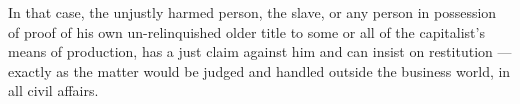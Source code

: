 In that case, the unjustly harmed person, the slave, or any person in possession of proof of his own un-relinquished older title to some or all of the capitalist’s means of production, has a just claim against him and can insist on restitution — exactly as the matter would be judged and handled outside the business world, in all civil affairs.